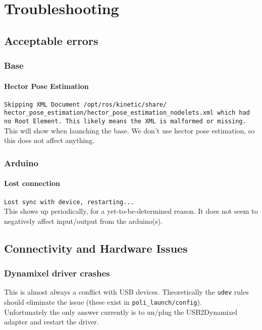 \chapter{Troubleshooting}\label{ch:troubleshooting}

\section{Acceptable errors}

\subsection{Base}
\subsubsection{Hector Pose Estimation}
\texttt{Skipping XML Document /opt/ros/kinetic/share/\\
hector\_pose\_estimation/hector\_pose\_estimation\_nodelets.xml which had no Root Element.  This likely means the XML is malformed or missing.} \\

This will show when launching the base. We don't use hector pose estimation, so this does not affect anything.

\subsection{Arduino}
\subsubsection{Lost connection}
\texttt{Lost sync with device, restarting...} \\

This shows up periodically, for a yet-to-be-determined reason. It does not seem to negatively affect input/output from the arduino(s).

\section{Connectivity and Hardware Issues}
\subsection{Dynamixel driver crashes}
This is almost always a conflict with USB devices. Theoretically the \texttt{udev} rules should eliminate the issue (these exist in \texttt{poli\_launch/config}). \\
Unfortunately the only answer currently is to un/plug the USB2Dynamixel adapter and restart the driver.

